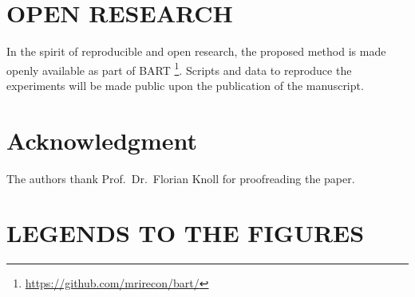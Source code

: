 \documentclass[a4paper,11pt]{article}
\begin{document}
\section*{OPEN RESEARCH}

In the spirit of reproducible and open research,
the proposed method is made openly available as part of BART
\footnote{\url{https://github.com/mrirecon/bart/}}.
Scripts and data to reproduce the experiments will be made public
upon the publication of the manuscript.

\section*{Acknowledgment}

The authors thank Prof.~Dr.~Florian Knoll for proofreading the paper.

\vfill
\pagebreak



\vfill
\pagebreak

\section*{LEGENDS TO THE FIGURES}
\end{document}
